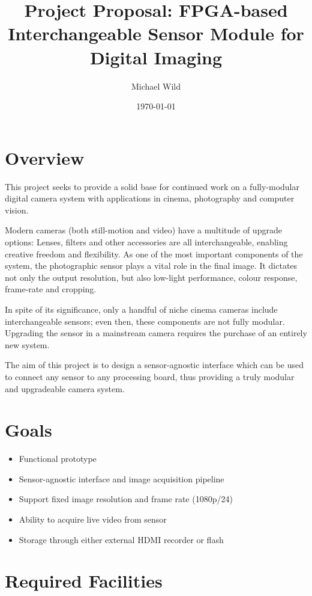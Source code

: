 \documentclass[a4paper]{article}
\title{Project Proposal: FPGA-based Interchangeable Sensor Module for Digital Imaging}
\author{Michael Wild}
\date{\today}
\begin{document}
\maketitle

\section{Overview}

This project seeks to provide a solid base for continued work on a fully-modular digital camera system with applications in cinema, photography and computer vision.

Modern cameras (both still-motion and video) have a multitude of upgrade options: Lenses, filters and other accessories are all interchangeable, enabling creative freedom and flexibility. As one of the most important components of the system, the photographic sensor plays a vital role in the final image. It dictates not only the output resolution, but also low-light performance, colour response, frame-rate and cropping. 

In spite of its significance, only a handful of niche cinema cameras include interchangeable sensors; even then, these components are not fully modular. Upgrading the sensor in a mainstream camera requires the purchase of an entirely new system.

The aim of this project is to design a sensor-agnostic interface which can be used to connect any sensor to any processing board, thus providing a truly modular and upgradeable camera system.

\section{Goals}

\begin{itemize}
\item Functional prototype 
\item Sensor-agnostic interface and image acquisition pipeline
\item Support fixed image resolution and frame rate (1080p/24)
\item Ability to acquire live video from sensor
\item Storage through either external HDMI recorder or flash
\end{itemize}

\section{Required Facilities}
\end{document}
